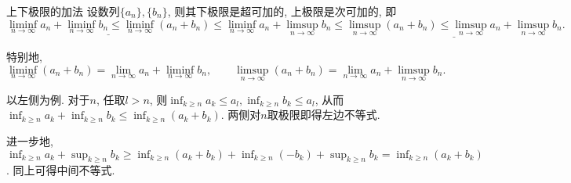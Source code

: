 \begin{exercise}{上下极限的加法} \label{exer:上下极限的加法}
	设数列$\{ a_n \}, \{ b_n \}$, 则其下极限是超可加的, 上极限是次可加的, 即
$$\underline{\liminf_{n\to \infty} a_n + \liminf_{n\to \infty} b_n \leq \liminf_{n\to \infty} (a_n+b_n) }\leq \liminf_{n\to \infty} a_n + \limsup_{n\to \infty} b_n \leq \underline{\limsup_{n\to \infty} (a_n+b_n) \leq \limsup_{n\to \infty} a_n + \limsup_{n\to \infty} b_n}.$$

特别地, $$\liminf_{n\to \infty} (a_n+b_n)  = \lim_{n\to \infty} a_n + \liminf_{n\to \infty} b_n , \qquad \limsup_{n\to \infty} (a_n+b_n)  = \lim_{n\to \infty} a_n + \limsup_{n\to \infty} b_n. $$
\end{exercise}
\begin{solution}
	以左侧为例. 对于$n$, 任取$l >n$, 则$\inf_{k \geq n}a_k \leq a_l, \inf_{k \geq n}b_k \leq a_l$, 从而$\inf_{k \geq n}a_k + \inf_{k \geq n}b_k \leq \inf_{k \geq n}(a_k+b_k)$. 两侧对$n$取极限即得左边不等式. 
	
	进一步地, $\inf_{k \geq n}a_k + \sup_{k \geq n}b_k \geq \inf_{k \geq n}(a_k+b_k) + \inf_{k \geq n}(-b_k) + \sup_{k \geq n}b_k = \inf_{k \geq n}(a_k+b_k)$. 同上可得中间不等式. 
\end{solution}

